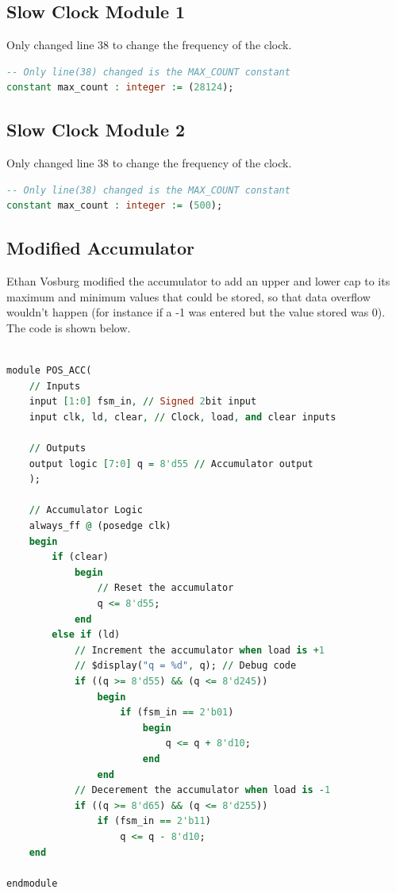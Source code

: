 \documentclass[
    a4paper, %
	12pt, %
    ]{CSSullivanBusinessReport}
\begin{document}
\subsection{Slow Clock Module 1}

Only changed line 38 to change the frequency of the clock.

\begin{lstlisting}[language=VHDL]
-- Only line(38) changed is the MAX_COUNT constant
constant max_count : integer := (28124);
\end{lstlisting}


\subsection{Slow Clock Module 2}

Only changed line 38 to change the frequency of the clock.

\begin{lstlisting}[language=VHDL]
-- Only line(38) changed is the MAX_COUNT constant
constant max_count : integer := (500);
\end{lstlisting}

\subsection{Modified Accumulator}

Ethan Vosburg modified the accumulator to add an upper and lower cap to its maximum and minimum values that could be stored, so that data overflow wouldn't happen (for instance if a -1 was entered but the value stored was 0). The code is shown below.

\begin{lstlisting}[language=VHDL]
    
module POS_ACC(
    // Inputs
    input [1:0] fsm_in, // Signed 2bit input
    input clk, ld, clear, // Clock, load, and clear inputs

    // Outputs
    output logic [7:0] q = 8'd55 // Accumulator output
    );
    
    // Accumulator Logic
    always_ff @ (posedge clk)
    begin
        if (clear)
            begin
                // Reset the accumulator
                q <= 8'd55;
            end 
        else if (ld)
            // Increment the accumulator when load is +1
            // $display("q = %d", q); // Debug code
            if ((q >= 8'd55) && (q <= 8'd245))
                begin    
                    if (fsm_in == 2'b01)
                        begin 
                            q <= q + 8'd10;
                        end
                end
            // Decerement the accumulator when load is -1
            if ((q >= 8'd65) && (q <= 8'd255))
                if (fsm_in == 2'b11)
                    q <= q - 8'd10;
    end

endmodule
\end{lstlisting}
\end{document}
